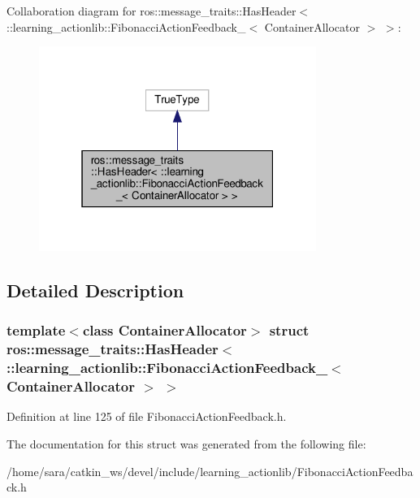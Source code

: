 Collaboration diagram for ros\+:\+:message\+\_\+traits\+:\+:Has\+Header$<$ \+:\+:learning\+\_\+actionlib\+:\+:Fibonacci\+Action\+Feedback\+\_\+$<$ Container\+Allocator $>$ $>$\+:
\nopagebreak
\begin{figure}[H]
\begin{center}
\leavevmode
\includegraphics[width=256pt]{structros_1_1message__traits_1_1HasHeader_3_01_1_1learning__actionlib_1_1FibonacciActionFeedback0fa97ea8ba05bed42e6316ed7622eb7c}
\end{center}
\end{figure}


\subsection{Detailed Description}
\subsubsection*{template$<$class Container\+Allocator$>$\newline
struct ros\+::message\+\_\+traits\+::\+Has\+Header$<$ \+::learning\+\_\+actionlib\+::\+Fibonacci\+Action\+Feedback\+\_\+$<$ Container\+Allocator $>$ $>$}



Definition at line 125 of file Fibonacci\+Action\+Feedback.\+h.



The documentation for this struct was generated from the following file\+:\begin{DoxyCompactItemize}
\item 
/home/sara/catkin\+\_\+ws/devel/include/learning\+\_\+actionlib/Fibonacci\+Action\+Feedback.\+h\end{DoxyCompactItemize}
